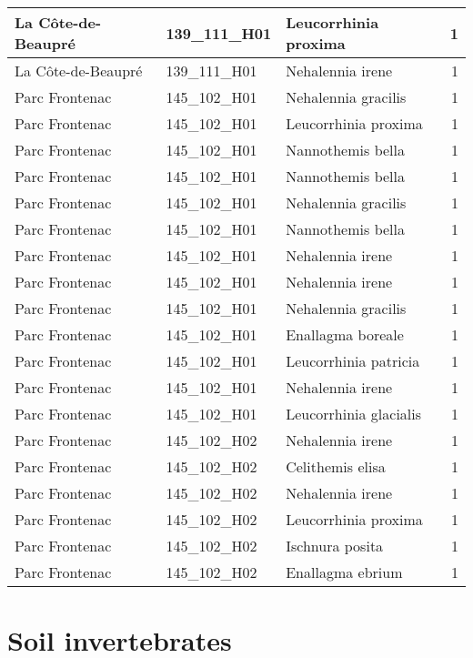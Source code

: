 \documentclass[
]{book}
\begin{document}
\begin{tabular}{l|l|l|r}
\hline
La Côte-de-Beaupré & 139\_111\_H01 & Leucorrhinia proxima & 1\\
\hline
La Côte-de-Beaupré & 139\_111\_H01 & Nehalennia irene & 1\\
\hline
Parc Frontenac & 145\_102\_H01 & Nehalennia gracilis & 1\\
\hline
Parc Frontenac & 145\_102\_H01 & Leucorrhinia proxima & 1\\
\hline
Parc Frontenac & 145\_102\_H01 & Nannothemis bella & 1\\
\hline
Parc Frontenac & 145\_102\_H01 & Nannothemis bella & 1\\
\hline
Parc Frontenac & 145\_102\_H01 & Nehalennia gracilis & 1\\
\hline
Parc Frontenac & 145\_102\_H01 & Nannothemis bella & 1\\
\hline
Parc Frontenac & 145\_102\_H01 & Nehalennia irene & 1\\
\hline
Parc Frontenac & 145\_102\_H01 & Nehalennia irene & 1\\
\hline
Parc Frontenac & 145\_102\_H01 & Nehalennia gracilis & 1\\
\hline
Parc Frontenac & 145\_102\_H01 & Enallagma boreale & 1\\
\hline
Parc Frontenac & 145\_102\_H01 & Leucorrhinia patricia & 1\\
\hline
Parc Frontenac & 145\_102\_H01 & Nehalennia irene & 1\\
\hline
Parc Frontenac & 145\_102\_H01 & Leucorrhinia glacialis & 1\\
\hline
Parc Frontenac & 145\_102\_H02 & Nehalennia irene & 1\\
\hline
Parc Frontenac & 145\_102\_H02 & Celithemis elisa & 1\\
\hline
Parc Frontenac & 145\_102\_H02 & Nehalennia irene & 1\\
\hline
Parc Frontenac & 145\_102\_H02 & Leucorrhinia proxima & 1\\
\hline
Parc Frontenac & 145\_102\_H02 & Ischnura posita & 1\\
\hline
Parc Frontenac & 145\_102\_H02 & Enallagma ebrium & 1\\
\hline
\end{tabular}

\hypertarget{soil-invertebrates}{%
\chapter{Soil invertebrates}\label{soil-invertebrates}}
\end{document}
